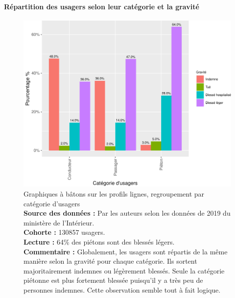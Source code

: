 \documentclass[french,]{tp}
\let\oldparagraph\paragraph
\renewcommand{\paragraph}[1]{\oldparagraph{#1}\mbox{}}
\begin{document}
\hypertarget{ruxe9partition-des-usagers-selon-leur-catuxe9gorie-et-la-gravituxe9}{%
\paragraph{Répartition des usagers selon leur catégorie et la gravité}\label{ruxe9partition-des-usagers-selon-leur-catuxe9gorie-et-la-gravituxe9}}







\begin{figure}[ht!]

{\centering \includegraphics{Prediction_Gravite_files/figure-latex/barplotcatu-1} 

}

\caption{Graphiques à bâtons sur les profils lignes, regroupement par catégorie d'usagers\\
\textbf{Source des données :} Par les auteurs selon les données de 2019 du ministère de l'Intérieur.\\
\textbf{Cohorte :} 130857 usagers.\\
\textbf{Lecture :} 64\% des piétons sont des blessés légers.\\
\textbf{Commentaire :} Globalement, les usagers sont répartis de la même manière selon la gravité pour chaque catégorie. Ils sortent majoritairement indemnes ou légèrement blessés. Seule la catégorie piétonne est plus fortement blessée puisqu'il y a très peu de personnes indemnes. Cette observation semble tout à fait logique.}\label{fig:barplotcatu}
\end{figure}
\end{document}
